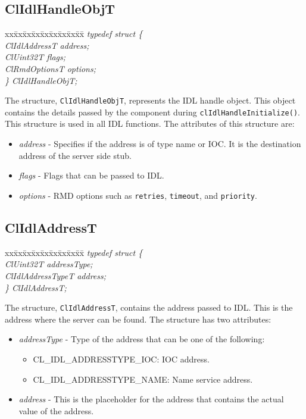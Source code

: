\begin{flushleft}
\subsection{ClIdlHandleObjT}
\begin{tabbing}
xx\=xx\=xx\=xx\=xx\=xx\=xx\=xx\=xx\=\kill
\textit{typedef struct \{}\\
\>\>\>\>\textit{ClIdlAddressT address;}\\
\>\>\>\>\textit{ClUint32T flags;}\\
\>\>\>\>\textit{ClRmdOptionsT options;}\\
\textit{\} ClIdlHandleObjT;}\end{tabbing}
The structure, {\tt{ClIdlHandleObjT}}, represents the IDL handle object. This object contains the details passed by the component during 
{\tt{clIdlHandleInitialize()}}. 
This structure is used in all IDL functions. The attributes of this structure are: 
\begin{itemize}
 \item
\textit{address} - Specifies if the address is of type name or IOC. It is
the destination address of the server side stub.
\item
\textit{flags} - Flags that can be passed to IDL.
\item
\textit{options} - RMD options such as {\tt{retries}}, {\tt{timeout}}, and {\tt{priority}}. 
 \end{itemize}
 


\subsection{ClIdlAddressT}
\begin{tabbing}
xx\=xx\=xx\=xx\=xx\=xx\=xx\=xx\=xx\=\kill
\textit{typedef struct \{}\\
\>\>\>\>\textit{ClUint32T                 addressType;}\\
\>\>\>\>\textit{ClIdlAddressTypeT  address;}\\
\textit{\} ClIdlAddressT;}\end{tabbing}
The structure, {\tt{ClIdlAddressT}}, contains the address passed to IDL. This is the address where the server can be found.
The structure has two attributes: 
\begin{itemize}
 \item
\textit{addressType} - Type of the address that can be one of the following:
\begin{itemize}
 \item
CL\_\-IDL\_\-ADDRESSTYPE\_\-IOC:  IOC address.
\item
CL\_\-IDL\_\-ADDRESSTYPE\_\-NAME: Name service address.
\end{itemize}
\item
\textit{address} - This is the placeholder for the address that contains the actual value of the address. 
 \end{itemize}



\end{flushleft}
